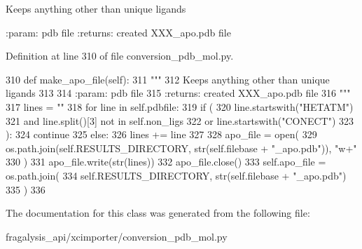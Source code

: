 \begin{DoxyVerb}Keeps anything other than unique ligands

:param: pdb file
:returns: created XXX_apo.pdb file
\end{DoxyVerb}
 

Definition at line 310 of file conversion\+\_\+pdb\+\_\+mol.\+py.


\begin{DoxyCode}
310     \textcolor{keyword}{def }make\_apo\_file(self):
311         \textcolor{stringliteral}{"""}
312 \textcolor{stringliteral}{        Keeps anything other than unique ligands}
313 \textcolor{stringliteral}{}
314 \textcolor{stringliteral}{        :param: pdb file}
315 \textcolor{stringliteral}{        :returns: created XXX\_apo.pdb file}
316 \textcolor{stringliteral}{        """}
317         lines = \textcolor{stringliteral}{""}
318         \textcolor{keywordflow}{for} line \textcolor{keywordflow}{in} self.pdbfile:
319             \textcolor{keywordflow}{if} (
320                 line.startswith(\textcolor{stringliteral}{"HETATM"})
321                 \textcolor{keywordflow}{and} line.split()[3] \textcolor{keywordflow}{not} \textcolor{keywordflow}{in} self.non\_ligs
322                 \textcolor{keywordflow}{or} line.startswith(\textcolor{stringliteral}{"CONECT"})
323             ):
324                 \textcolor{keywordflow}{continue}
325             \textcolor{keywordflow}{else}:
326                 lines += line
327 
328         apo\_file = open(
329             os.path.join(self.RESULTS\_DIRECTORY, str(self.filebase + \textcolor{stringliteral}{"\_apo.pdb"})), \textcolor{stringliteral}{"w+"}
330         )
331         apo\_file.write(str(lines))
332         apo\_file.close()
333         self.apo\_file = os.path.join(
334             self.RESULTS\_DIRECTORY, str(self.filebase + \textcolor{stringliteral}{"\_apo.pdb"})
335         )
336 
\end{DoxyCode}


The documentation for this class was generated from the following file\+:\begin{DoxyCompactItemize}
\item 
fragalysis\+\_\+api/xcimporter/conversion\+\_\+pdb\+\_\+mol.\+py\end{DoxyCompactItemize}

